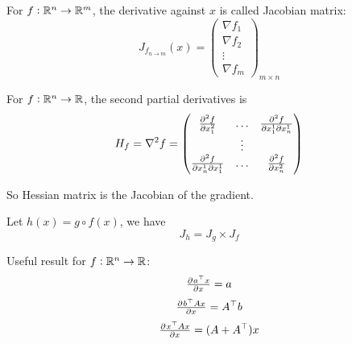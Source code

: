 \begin{definition}
    For $f: \mathbb{R}^n \rightarrow \mathbb{R}^m$, the derivative against $x$ is called Jacobian matrix:
    \begin{equation}
        J_{f_{n \rightarrow m}} (x) = \begin{pmatrix}
            \nabla f_1 \\
            \nabla f_2 \\
            \vdots \\
            \nabla f_m
        \end{pmatrix}_{m \times n}
    \end{equation}
    
\end{definition}


\begin{definition}
    For $f: \mathbb{R}^n \rightarrow \mathbb{R}$, the second partial derivatives is
    \begin{equation}
        H_f = \nabla^2 f = \begin{pmatrix}
            \pd[2]{f}{x_1} & \hdots & \md{f}{2}{x_1}{1}{x_n}{1} \\
            & \vdots \\
            \md{f}{2}{x_n}{1}{x_1}{1} & \hdots & \pd[2]{f}{x_n}
        \end{pmatrix}
    \end{equation}
    
    So Hessian matrix is the Jacobian of the gradient.
\end{definition}





\begin{definition}
    Let $h(x) = g \circ f (x)$, we have
    \begin{equation}
        J_h = J_g \times J_f
    \end{equation}
\end{definition}



\begin{example}
    Useful result for $f:\mathbb{R}^n \rightarrow \mathbb{R}$:
    \begin{equation}
        \pd{\transpose{a}x}{x} = a
    \end{equation}   
    \begin{equation}
        \pd{\transpose{b}Ax}{x} = \transpose{A}b
    \end{equation}
    \begin{equation}
        \pd{\transpose{x}Ax}{x} = (A + \transpose{A}) x
    \end{equation}
\end{example}

